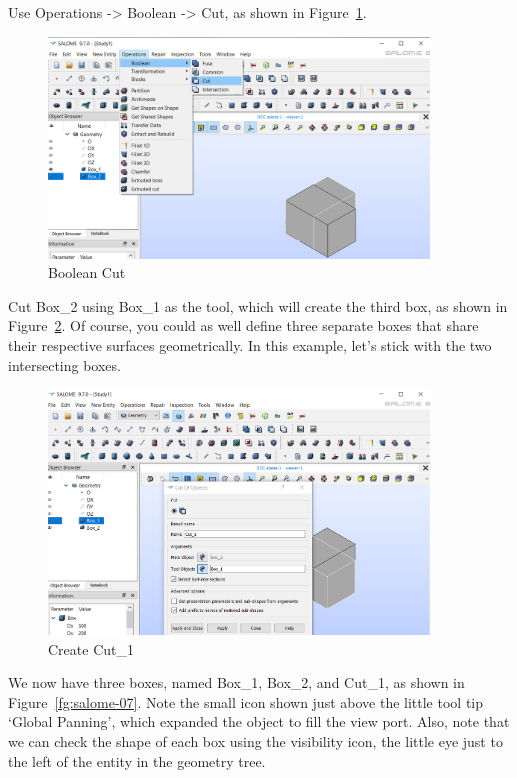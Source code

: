 Use Operations -> Boolean -> Cut, as shown in Figure~\ref{fg:salome-05}.

\begin{figure}[H]
\centering
\includegraphics[width=0.9\textwidth]{Salome-05}
\caption{Boolean Cut}\label{fg:salome-05}
\end{figure}

Cut Box\_2 using Box\_1 as the tool, which will create the third box, as shown in Figure~\ref{fg:salome-06}.  Of course, you could as well define three separate boxes that share their respective surfaces geometrically. In this example, let's stick with the two intersecting boxes.

\begin{figure}[H]
\centering
\includegraphics[width=0.9\textwidth]{Salome-06}
\caption{Create Cut\_1}\label{fg:salome-06}
\end{figure}

We now have three boxes, named Box\_1, Box\_2, and Cut\_1, as shown in Figure~\ref{fg:salome-07}.  Note the small icon shown just above the little tool tip `Global Panning', which expanded the object to fill the view port.  Also, note that we can check the shape of each box using the visibility icon, the little eye just to the left of the entity in the geometry tree.

